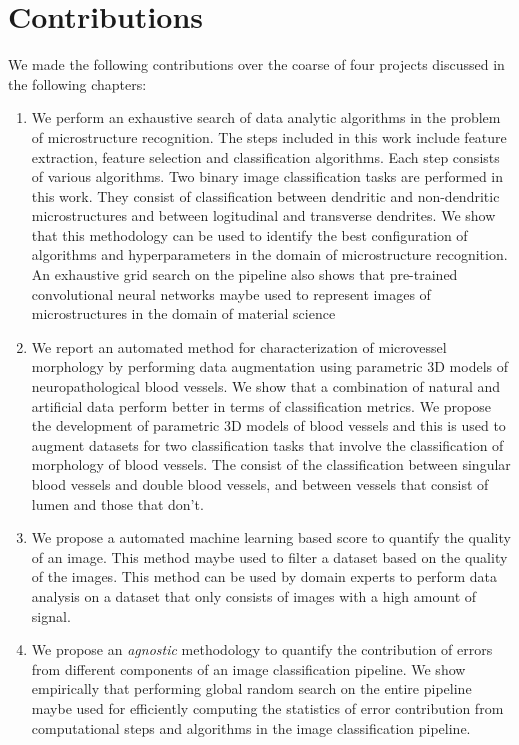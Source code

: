 \section{Contributions}
We made the following contributions over the coarse of four projects discussed in the following chapters:
\begin{enumerate}
\item We perform an exhaustive search of data analytic algorithms in the problem of microstructure recognition. The steps included in this work include feature extraction, feature selection and classification algorithms. Each step consists of various algorithms. Two binary image classification tasks are performed in this work. They consist of classification between dendritic and non-dendritic microstructures and between logitudinal and transverse dendrites. We show that this methodology can be used to identify the best configuration of algorithms and hyperparameters in the domain of microstructure recognition.
An exhaustive grid search on the pipeline also shows that pre-trained convolutional neural networks maybe used to represent images of microstructures in the domain of material science

\item We report an automated method for characterization of microvessel morphology by performing data augmentation using parametric 3D models of neuropathological blood vessels. We show that a combination of natural and artificial data perform better in terms of classification metrics.  We propose the development of parametric 3D models of blood vessels and this is used to augment datasets for two classification tasks that involve the classification of morphology of blood vessels. The consist of the classification between singular blood vessels and double blood vessels, and between vessels that consist of lumen and those that don't.

\item We propose a  automated machine learning based score to quantify the quality of an image. This method maybe used to filter a dataset based on the quality of the images. This method can be used by domain experts to perform data analysis on a dataset that only consists of images with a high amount of signal. 

\item We propose an \textit{agnostic} methodology to quantify the contribution of errors from different components of an image classification pipeline. 
We show empirically that performing global random search on the entire pipeline maybe used for efficiently computing the statistics of error contribution from computational steps and algorithms in the image classification pipeline.

\end{enumerate}

